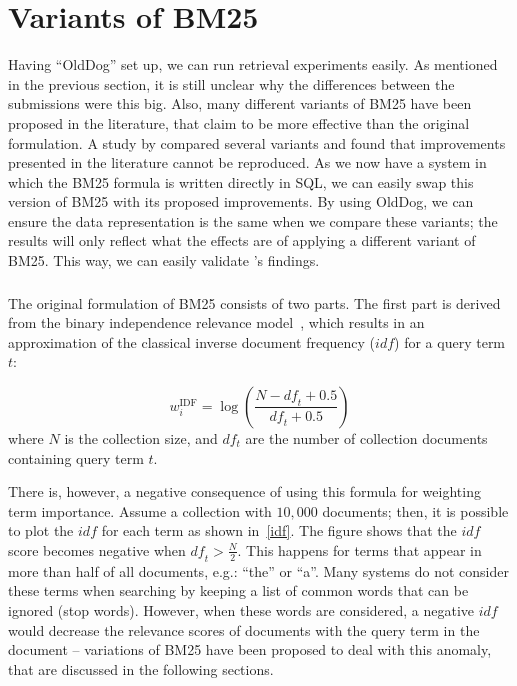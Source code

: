\section{Variants of BM25}
\label{ir_db_variants}
Having ``OldDog'' set up, we can run retrieval experiments easily. As mentioned in the previous section, it is still unclear why the differences between the submissions were this big. Also, many different variants of BM25 have been proposed in the literature, that claim to be more effective than the original formulation. A study by \citet{trotman-bm25} compared several variants and found that improvements presented in the literature cannot be reproduced. 
As we now have a system in which the BM25 formula is written directly in SQL, we can easily swap this version of BM25 with its proposed improvements. By using OldDog, we can ensure the data representation is the same when we compare these variants; the results will only reflect what the effects are of applying a different variant of BM25. This way, we can easily validate \citeauthor{trotman-bm25}'s findings.

\subsubsection{} 
The original formulation of BM25 consists of two parts. The first part is derived from the binary independence relevance model~\citep{bm25-beyond}, which results in an approximation of the classical inverse document frequency ($\mathit{idf}$) for a query term $t$:

\begin{equation} 
	w_i^{\text{IDF}} = \log\left(\frac{N-\mathit{df}_t+0.5}{\mathit{df}_t+0.5}\right)
\end{equation}
where $N$ is the collection size, and $df_t$ are the number of collection documents containing query term $t$.  

There is, however, a negative consequence of using this formula for weighting term importance. Assume a collection with $10,000$ documents; then, it is possible to plot the $\mathit{idf}$ for each term as shown in~\cref{idf}. The figure shows that the $\mathit{idf}$ score becomes negative when $\mathit{df}_t > \frac{N}{2}$. This happens for terms that appear in more than half of all documents, e.g.: ``the'' or ``a''. Many systems do not consider these terms when searching by keeping a list of common words that can be ignored (stop words). However, when these words are considered,  a negative $\mathit{idf}$ would decrease the relevance scores of documents with the query term in the document -- variations of BM25 have been proposed to deal with this anomaly, that are discussed in the following sections. 

